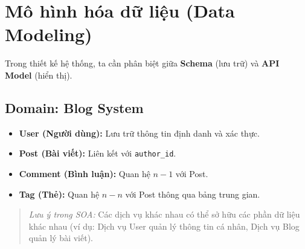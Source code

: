 \documentclass[12pt, a4paper]{article}
\begin{document}
\section{Mô hình hóa dữ liệu (Data Modeling)}
Trong thiết kế hệ thống, ta cần phân biệt giữa \textbf{Schema} (lưu trữ) và \textbf{API Model} (hiển thị). 

\subsection{Domain: Blog System}
\begin{itemize}
    \item \textbf{User (Người dùng):} Lưu trữ thông tin định danh và xác thực.
    \item \textbf{Post (Bài viết):} Liên kết với \texttt{author\_id}. 
    \item \textbf{Comment (Bình luận):} Quan hệ $n-1$ với Post.
    \item \textbf{Tag (Thẻ):} Quan hệ $n-n$ với Post thông qua bảng trung gian.
\end{itemize}

\begin{quote}
\textit{Lưu ý trong SOA:} Các dịch vụ khác nhau có thể sở hữu các phần dữ liệu khác nhau (ví dụ: Dịch vụ User quản lý thông tin cá nhân, Dịch vụ Blog quản lý bài viết).
\end{quote}
\end{document}

